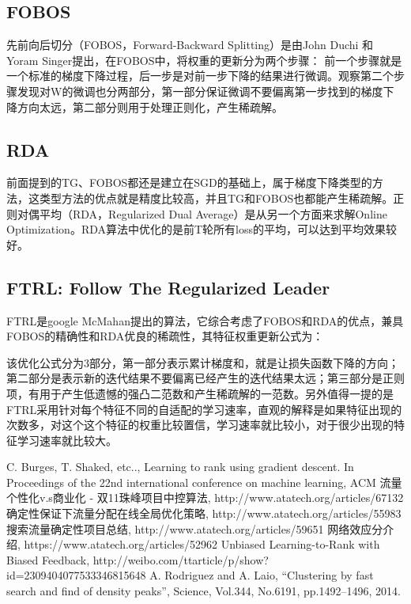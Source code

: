 \subsection{FOBOS}
先前向后切分（FOBOS，Forward-Backward Splitting）是由John Duchi 和Yoram Singer提出，在FOBOS中，将权重的更新分为两个步骤：
前一个步骤就是一个标准的梯度下降过程，后一步是对前一步下降的结果进行微调。观察第二个步骤发现对W的微调也分两部分，第一部分保证微调不要偏离第一步找到的梯度下降方向太远，第二部分则用于处理正则化，产生稀疏解。

\subsection{RDA}
前面提到的TG、FOBOS都还是建立在SGD的基础上，属于梯度下降类型的方法，这类型方法的优点就是精度比较高，并且TG和FOBOS也都能产生稀疏解。正则对偶平均（RDA，Regularized Dual Average）是从另一个方面来求解Online Optimization。RDA算法中优化的是前T轮所有loss的平均，可以达到平均效果较好。

\subsection{FTRL: Follow The Regularized Leader}
FTRL是google McMahan提出的算法，它综合考虑了FOBOS和RDA的优点，兼具FOBOS的精确性和RDA优良的稀疏性，其特征权重更新公式为：

该优化公式分为3部分，第一部分表示累计梯度和，就是让损失函数下降的方向；第二部分是表示新的迭代结果不要偏离已经产生的迭代结果太远；第三部分是正则项，有用于产生低遗憾的强凸二范数和产生稀疏解的一范数。另外值得一提的是FTRL采用针对每个特征不同的自适配的学习速率，直观的解释是如果特征出现的次数多，对这个这个特征的权重比较置信，学习速率就比较小，对于很少出现的特征学习速率就比较大。


\begin{thebibliography}{99}
 C. Burges, T. Shaked, etc.., Learning to rank 
using gradient descent. In Proceedings of the 22nd international 
conference on machine learning, ACM
 流量个性化v.s商业化 - 双11珠峰项目中控算法, http://www.atatech.org/articles/67132
 确定性保证下流量分配在线全局优化策略, http://www.atatech.org/articles/55983
 搜索流量确定性项目总结, http://www.atatech.org/articles/59651
 网络效应分介绍, https://www.atatech.org/articles/52962
 Unbiased Learning-to-Rank with Biased Feedback, http://weibo.com/ttarticle/p/show?id=2309404077533346815648
 A. Rodriguez and A. Laio, “Clustering by fast search and find of density peaks”, Science, Vol.344, No.6191, pp.1492–1496, 2014.

\end{thebibliography}

 
